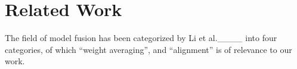 \section{Related Work}





The field of model fusion has been categorized by Li et al.____ into four categories, of which ``weight averaging'', and ``alignment'' is of relevance to our work.

